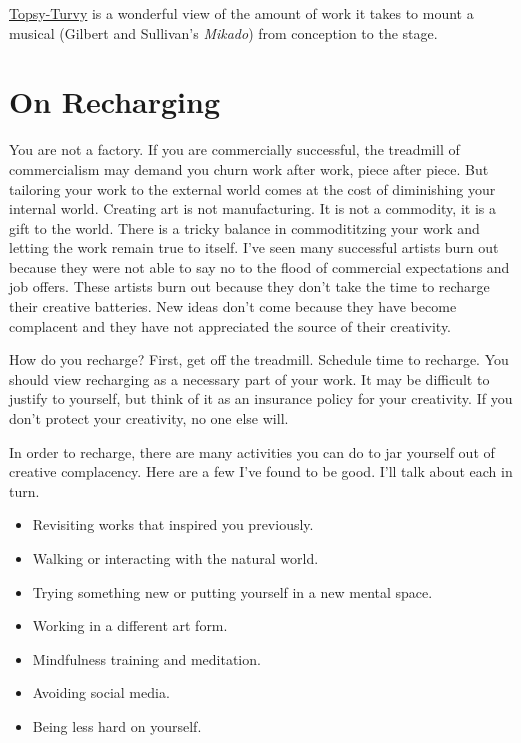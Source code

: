 \documentclass[
]{book}
\providecommand{\tightlist}{%
  \setlength{\itemsep}{0pt}\setlength{\parskip}{0pt}}
\begin{document}
\href{http://m.imdb.com/title/tt0151568/}{Topsy-Turvy} is a wonderful view of the amount of work it takes to mount a musical (Gilbert and Sullivan's \emph{Mikado}) from conception to the stage.

\hypertarget{on-recharging}{%
\chapter{On Recharging}\label{on-recharging}}

You are not a factory. If you are commercially successful, the treadmill of commercialism may demand you churn work after work, piece after piece. But tailoring your work to the external world comes at the cost of diminishing your internal world. Creating art is not manufacturing. It is not a commodity, it is a gift to the world. There is a tricky balance in commodititzing your work and letting the work remain true to itself. I've seen many successful artists burn out because they were not able to say no to the flood of commercial expectations and job offers. These artists burn out because they don't take the time to recharge their creative batteries. New ideas don't come because they have become complacent and they have not appreciated the source of their creativity.

How do you recharge? First, get off the treadmill. Schedule time to recharge. You should view recharging as a necessary part of your work. It may be difficult to justify to yourself, but think of it as an insurance policy for your creativity. If you don't protect your creativity, no one else will.

In order to recharge, there are many activities you can do to jar yourself out of creative complacency. Here are a few I've found to be good. I'll talk about each in turn.

\begin{itemize}
\tightlist
\item
  Revisiting works that inspired you previously.
\item
  Walking or interacting with the natural world.
\item
  Trying something new or putting yourself in a new mental space.
\item
  Working in a different art form.
\item
  Mindfulness training and meditation.
\item
  Avoiding social media.
\item
  Being less hard on yourself.
\end{itemize}
\end{document}
